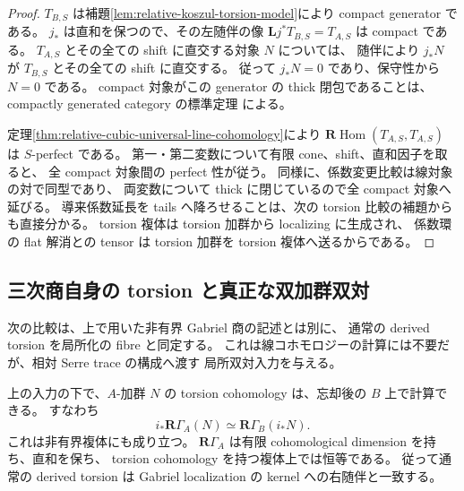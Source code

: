 \begin{proof}
$T_{B,S}$ は補題\ref{lem:relative-koszul-torsion-model}により compact generator である。
$j_*$ は直和を保つので、その左随伴の像
$\mathbf Lj^*T_{B,S}=T_{A,S}$ は compact である。
$T_{A,S}$ とその全ての shift に直交する対象 $N$ については、
随伴により $j_*N$ が $T_{B,S}$ とその全ての shift に直交する。
従って $j_*N=0$ であり、保守性から $N=0$ である。
compact 対象がこの generator の thick 閉包であることは、
compactly generated category の標準定理
\cite[Theorem~3.4]{KellerDgCategories}による。

定理\ref{thm:relative-cubic-universal-line-cohomology}により
$\mathbf R\operatorname{Hom}(T_{A,S},T_{A,S})$ は $S$-perfect である。
第一・第二変数について有限 cone、shift、直和因子を取ると、
全 compact 対象間の perfect 性が従う。
同様に、係数変更比較は線対象の対で同型であり、
両変数について thick に閉じているので全 compact 対象へ延びる。
導来係数延長を tails へ降ろせることは、次の torsion 比較の補題からも直接分かる。
torsion 複体は torsion 加群から localizing に生成され、
係数環の flat 解消との tensor は torsion 加群を torsion 複体へ送るからである。
\end{proof}

\subsection{三次商自身の torsion と真正な双加群双対}

次の比較は、上で用いた非有界 Gabriel 商の記述とは別に、
通常の derived torsion を局所化の fibre と同定する。
これは線コホモロジーの計算には不要だが、相対 Serre trace の構成へ渡す
局所双対入力を与える。

\begin{lemma}
\label{lem:relative-cubic-torsion-comparison}
上の入力の下で、$A$-加群 $N$ の torsion cohomology は、忘却後の $B$ 上で計算できる。
すなわち
\[
 i_*\mathbf R\Gamma_A(N)\simeq\mathbf R\Gamma_B(i_*N).
\]
これは非有界複体にも成り立つ。
$\mathbf R\Gamma_A$ は有限 cohomological dimension を持ち、直和を保ち、
torsion cohomology を持つ複体上では恒等である。
従って通常の derived torsion は Gabriel localization の kernel への右随伴と一致する。
\end{lemma}

